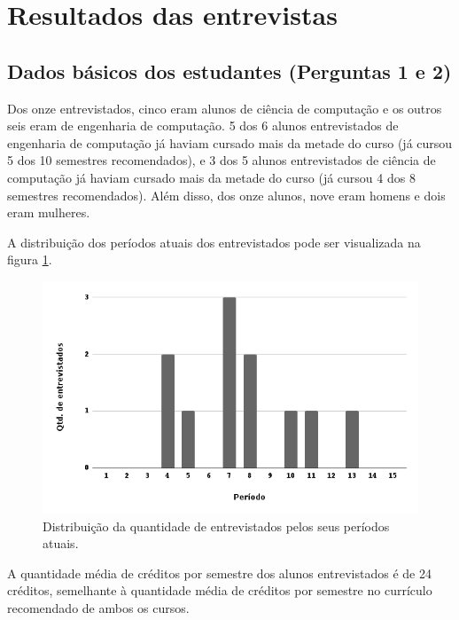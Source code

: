 \section{Resultados das entrevistas}

\subsection{Dados básicos dos estudantes (Perguntas 1 e 2)}
\label{sec:dados-basicos-estudantes}

Dos onze entrevistados, cinco eram alunos de ciência de computação e os outros seis eram de engenharia de computação. 5 dos 6 alunos entrevistados de engenharia de computação já haviam cursado mais da metade do curso (já cursou 5 dos 10 semestres recomendados), e 3 dos 5 alunos entrevistados de ciência de computação já haviam cursado mais da metade do curso (já cursou 4 dos 8 semestres recomendados). Além disso, dos onze alunos, nove eram homens e dois eram mulheres.

A distribuição dos períodos atuais dos entrevistados pode ser visualizada na figura \ref{fig:entrevista-grafico}. 

\begin{figure}[!ht]
    \begin{center}
    \includegraphics[width=350pt]{figuras/grafico-entrevista}
    \caption{Distribuição da quantidade de entrevistados pelos seus períodos atuais.}
    \label{fig:entrevista-grafico}
    \end{center}
  \end{figure}
  
A quantidade média de créditos por semestre dos alunos entrevistados é de 24 créditos, semelhante à quantidade média de créditos por semestre no currículo recomendado de ambos os cursos.

